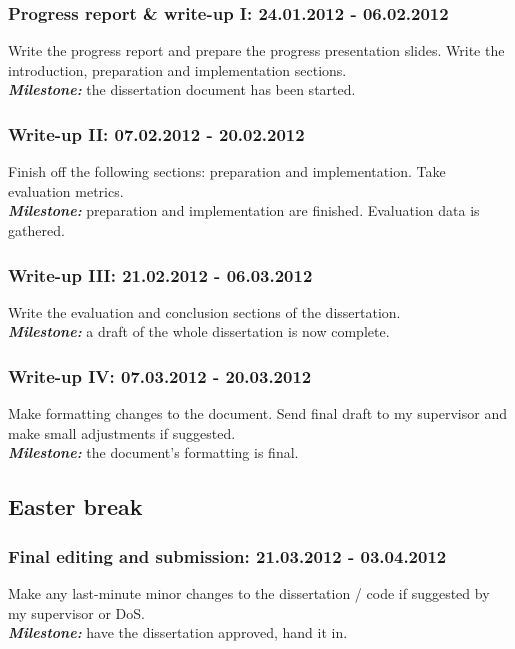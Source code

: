 \documentclass[12pt,a4paper, twoside]{article}
\begin{document}
\subsubsection*{Progress report \& write-up I: 24.01.2012 -
06.02.2012} Write the progress report and prepare the progress
presentation slides. Write the introduction, preparation and
implementation sections.  \\\textbf{\emph{Milestone:}} the
dissertation document has been started.

\subsubsection*{Write-up II: 07.02.2012 - 20.02.2012} Finish off the
following sections: preparation and implementation.  Take evaluation
metrics.  \\\textbf{\emph{Milestone:}} preparation and implementation
are finished. Evaluation data is gathered.

\subsubsection*{Write-up III: 21.02.2012 - 06.03.2012} Write the
evaluation and conclusion sections of the dissertation.
\\\textbf{\emph{Milestone:}} a draft of the whole dissertation is now
complete.

\subsubsection*{Write-up IV: 07.03.2012 - 20.03.2012} Make formatting
changes to the document. Send final draft to my supervisor and make
small adjustments if suggested.  \\\textbf{\emph{Milestone:}} the
document's formatting is final.

\subsection*{Easter break}
\subsubsection*{Final editing and submission: 21.03.2012 - 03.04.2012}
Make any last-minute minor changes to the dissertation / code if
suggested by my supervisor or DoS.  \\\textbf{\emph{Milestone:}} have
the dissertation approved, hand it in.


\end{document}
